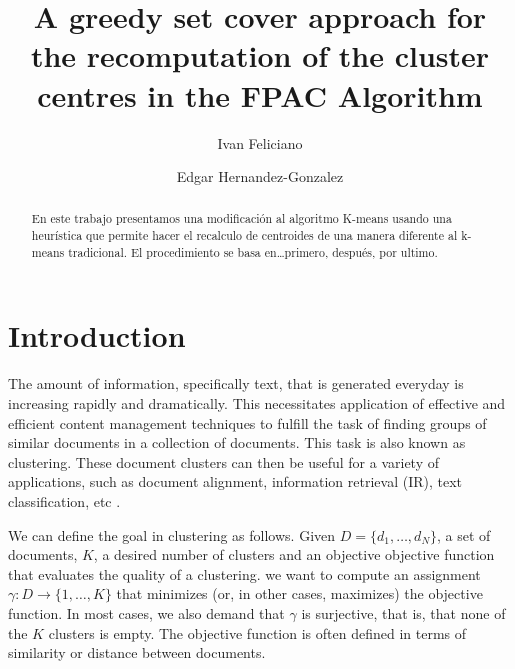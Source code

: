 \documentclass[runningheads]{llncs}
\begin{document}
%
\title{A greedy set cover approach for the recomputation of the cluster centres in the FPAC Algorithm}

\author{Ivan Feliciano \and
Edgar Hernandez-Gonzalez}
%
%
\maketitle              %
\begin{abstract}
En este trabajo presentamos una modificación al algoritmo K-means usando una heurística que permite hacer el recalculo de centroides de una manera diferente al k-means tradicional. El procedimiento se basa en…primero, después, por ultimo.

\end{abstract}
%
%
%
\section{Introduction}


The amount of information, specifically text, that is generated everyday
is increasing rapidly and dramatically. This necessitates application of effective and efficient content management techniques to fulfill the task of finding groups of similar documents in a collection of documents. This task is also known as 
clustering. These document clusters can then be useful for a variety
of applications, such as document alignment, information retrieval
(IR), text classification, etc \cite{ganguly_2018}.

We can define the goal in clustering as follows. 
Given $D = \{d_1 , \dots , d_N \}$, a set of documents, 
$K$, a desired number of clusters and 
an objective objective function that evaluates the quality of a clustering.
we want to compute an assignment $\gamma : D \rightarrow \{1, \dots , K \}$ that minimizes (or, in other cases,
maximizes) the objective function. In most cases, we also demand that $\gamma$ is
surjective, that is, that none of the $K$ clusters is empty.
The objective function is often defined in terms of similarity or distance between documents.
\end{document}
